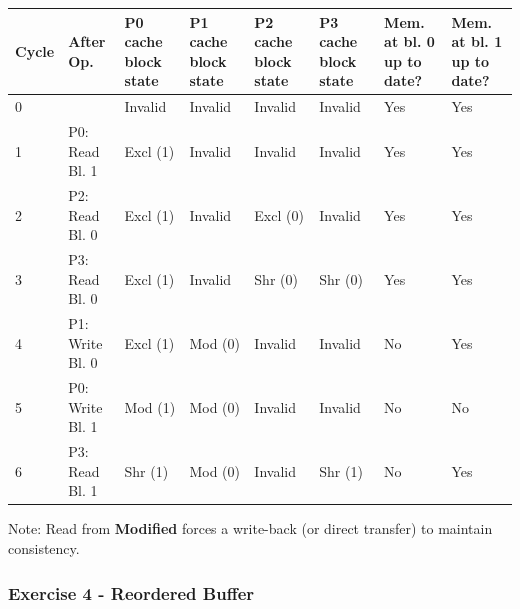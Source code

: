 \begin{enumerate}
    \begin{table}[!htp]
        \centering
        \begin{adjustbox}{width={\textwidth},totalheight={\textheight},keepaspectratio}
            \begin{tabular}{@{} l l p{4em} p{4em} p{4em} p{4em} p{3em} p{3em} @{}}
                \toprule
                \textbf{Cycle} & \textbf{After Op.} & \textbf{P0 cache block state} & \textbf{P1 cache block state} & \textbf{P2 cache block state} & \textbf{P3 cache block state} & \textbf{Mem. at bl. 0 up to date?} & \textbf{Mem. at bl. 1 up to date?} \\
                \midrule
                0   &                   & Invalid   & Invalid   & Invalid   & Invalid   & Yes   & Yes   \\ [.3em]
                1   & P0: Read Bl. 1    & Excl (1)  & Invalid   & Invalid   & Invalid   & Yes   & Yes   \\ [.3em]
                2   & P2: Read Bl. 0    & Excl (1)  & Invalid   & Excl (0)  & Invalid   & Yes   & Yes   \\ [.3em]
                3   & P3: Read Bl. 0    & Excl (1)  & Invalid   & Shr (0)   & Shr (0)   & Yes   & Yes   \\ [.3em]
                4   & P1: Write Bl. 0   & Excl (1)  & Mod (0)   & Invalid   & Invalid   & No    & Yes   \\ [.3em]
                5   & P0: Write Bl. 1   & Mod (1)   & Mod (0)   & Invalid   & Invalid   & No    & No    \\ [.3em]
                6   & P3: Read Bl. 1    & Shr (1)   & Mod (0)   & Invalid   & Shr (1)   & No    & Yes   \\
                \bottomrule
            \end{tabular}
        \end{adjustbox}
    \end{table}
\end{enumerate}
Note: Read from \textbf{Modified} forces a write-back (or direct transfer) to maintain consistency.

\newpage

\subsubsection*{Exercise 4 - Reordered Buffer}

